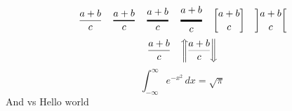 \documentclass{amsart}
\begin{document}
\[
    \frac{a+b}c \quad
    \genfrac{}{}{1pt}{}{a+b}c \quad
    \genfrac{}{}{1.5pt}{}{a+b}c \quad
    \genfrac{}{}{2pt}{}{a+b}c \quad
    \genfrac{[}{]}{0pt}{}{a+b}c \quad
    \genfrac{]}{[}{0pt}{}{a+b}c
\]
\[
    \frac{a+b}c \quad
    \genfrac{\Uparrow}{\Downarrow}{0.2pt}{}{a+b}c
\]
\begin{equation}
    \boxed{\int_{-\infty}^\infty e^{-x^2}\,dx = \sqrt\pi}
\end{equation}
And  vs $\boxed{\text{Hello world}}$
\end{document}
